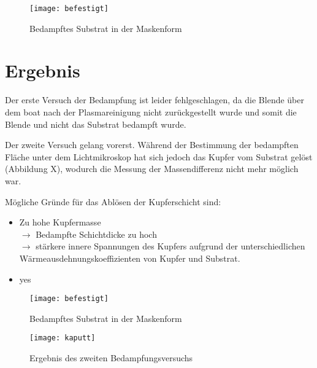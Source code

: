 \documentclass[a4paper, 12pt]{article}
\begin{document}
\begin{figure}[H]
	\begin{center}
		\texttt{[image: befestigt]}
	\end{center}
\caption{Bedampftes Substrat in der Maskenform}
\end{figure}

\section{Ergebnis}
Der erste Versuch der Bedampfung ist leider fehlgeschlagen, da die Blende über dem boat nach der Plasmareinigung nicht zurückgestellt wurde und somit die Blende und nicht das Substrat bedampft wurde. 

Der zweite Versuch gelang vorerst. Während der Bestimmung der bedampften Fläche unter dem Lichtmikroskop hat sich jedoch das Kupfer vom Substrat gelöst (Abbildung X), wodurch die Messung der Massendifferenz nicht mehr möglich war.

\noindent Mögliche Gründe für das Ablösen der Kupferschicht sind:
\begin{itemize}
	\item Zu hohe Kupfermasse \\$\rightarrow$ Bedampfte Schichtdicke zu hoch\\ $\rightarrow$ stärkere innere Spannungen des Kupfers aufgrund der unterschiedlichen Wärmeausdehnungskoeffizienten von Kupfer und Substrat.
	\item yes
\end{itemize}  

\begin{figure}[H]
	\begin{center}
		\texttt{[image: befestigt]}
	\end{center}
	\caption{Bedampftes Substrat in der Maskenform}
\end{figure}

\begin{figure}[H]
	\begin{center}
		\texttt{[image: kaputt]}
	\end{center}
	\caption{Ergebnis des zweiten Bedampfungsversuchs}
\end{figure}
\end{document}
